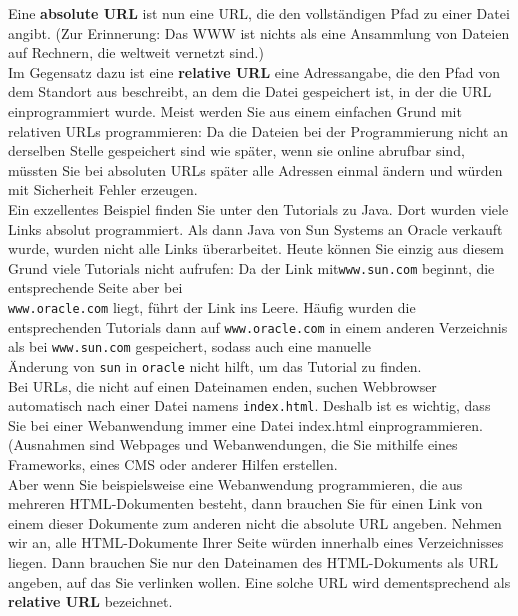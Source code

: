 Eine \textbf{absolute URL} ist nun eine URL, die den vollständigen Pfad zu einer Datei angibt. (Zur Erinnerung: Das WWW ist nichts als eine Ansammlung von Dateien auf Rechnern, die weltweit vernetzt sind.)\\

Im Gegensatz dazu ist eine \textbf{relative URL} eine Adressangabe, die den Pfad von dem Standort aus beschreibt, an dem die Datei gespeichert ist, in der die URL einprogrammiert wurde. Meist werden Sie aus einem einfachen Grund mit relativen URLs programmieren: Da die Dateien bei der Programmierung nicht an derselben Stelle gespeichert sind wie später, wenn sie online abrufbar sind, müssten Sie bei absoluten URLs später alle Adressen einmal ändern und würden mit Sicherheit Fehler erzeugen.\\

Ein \glqq{}exzellentes\grqq{} Beispiel finden Sie unter den Tutorials zu Java. Dort wurden viele Links absolut programmiert. Als dann Java von Sun Systems an Oracle verkauft wurde, wurden nicht alle Links überarbeitet. Heute können Sie einzig aus diesem Grund viele Tutorials nicht aufrufen: Da der Link mit\verb|www.sun.com| beginnt, die entsprechende Seite aber bei \\\verb|www.oracle.com| liegt, führt der Link ins Leere. Häufig wurden die entsprechenden Tutorials dann auf \verb|www.oracle.com| in einem anderen Verzeichnis als bei \verb|www.sun.com| gespeichert, sodass auch eine manuelle\\Änderung von \verb|sun| in \verb|oracle| nicht hilft, um das Tutorial zu finden.\\

Bei URLs, die nicht auf einen Dateinamen enden, suchen Webbrowser automatisch nach einer Datei namens \verb|index.html|. Deshalb ist es wichtig, dass Sie bei einer Webanwendung immer eine Datei index.html einprogrammieren. (Ausnahmen sind Webpages und Webanwendungen, die Sie mithilfe eines Frameworks, eines CMS oder anderer \glqq{}Hilfen\grqq{} erstellen.\\

Aber wenn Sie beispielsweise eine Webanwendung programmieren, die aus mehreren HTML-Dokumenten besteht, dann brauchen Sie für einen Link von einem dieser Dokumente zum anderen nicht die absolute URL angeben. Nehmen wir an, alle HTML-Dokumente Ihrer Seite würden innerhalb eines Verzeichnisses liegen. Dann brauchen Sie nur den Dateinamen des HTML-Dokuments als URL angeben, auf das Sie verlinken wollen. Eine solche URL wird dementsprechend als \textbf{relative URL} bezeichnet.\\

